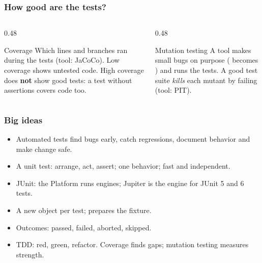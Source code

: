 \documentclass[aspectratio=169,10pt,compress]{beamer}
\begin{document}
\begin{frame}[t,fragile] \frametitle{How good are the tests?}
  \begin{columns}[T]
    \begin{column}{0.48\textwidth}
      \begin{block}{Coverage}
        \small Which lines and branches ran during the tests (tool: JaCoCo).
        Low coverage shows untested code. High coverage does \textbf{not} show good tests: a test without
        assertions covers code too.
      \end{block}
    \end{column}
    \begin{column}{0.48\textwidth}
      \begin{block}{Mutation testing}
        \small A tool makes small bugs on purpose (\hCode{>=} becomes \hCode{>}) and runs the tests.
        A good test suite \emph{kills} each mutant by failing (tool: PIT).
      \end{block}
    \end{column}
  \end{columns}
\end{frame}





\begin{frame}[t,fragile] \frametitle{Big ideas}
  \begin{itemize}
    \item Automated tests find bugs early, catch regressions, document behavior and make change safe.
    \item A unit test: arrange, act, assert; one behavior; fast and independent.
    \item JUnit: the Platform runs engines; Jupiter is the engine for JUnit 5 and 6 tests.
    \item A new object per test;  prepares the fixture.
    \item Outcomes: passed, failed, aborted, skipped.
    \item TDD: red, green, refactor. Coverage finds gaps; mutation testing measures strength.
  \end{itemize}
\end{frame}
\end{document}
